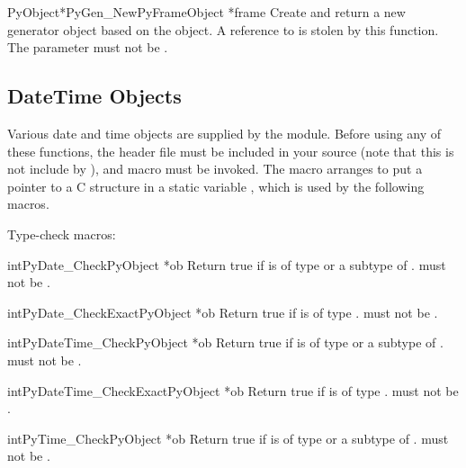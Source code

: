 \begin{cfuncdesc}{PyObject*}{PyGen_New}{PyFrameObject *frame}
  Create and return a new generator object based on the  object.
  A reference to  is stolen by this function.
  The parameter must not be \NULL{}.
\end{cfuncdesc}


\subsection{DateTime Objects \label{datetime-objects}}

Various date and time objects are supplied by the 
module.  Before using any of these functions, the header file
 must be included in your source (note that this is
not include by ), and macro 
must be invoked.  The macro arranges to put a pointer to a C structure
in a static variable , which is used by the following
macros.

Type-check macros:

\begin{cfuncdesc}{int}{PyDate_Check}{PyObject *ob}
  Return true if  is of type  or
  a subtype of .   must not be
  \NULL{}.
\end{cfuncdesc}

\begin{cfuncdesc}{int}{PyDate_CheckExact}{PyObject *ob}
  Return true if  is of type .
   must not be \NULL{}.
\end{cfuncdesc}

\begin{cfuncdesc}{int}{PyDateTime_Check}{PyObject *ob}
  Return true if  is of type  or
  a subtype of .   must not be
  \NULL{}.
\end{cfuncdesc}

\begin{cfuncdesc}{int}{PyDateTime_CheckExact}{PyObject *ob}
  Return true if  is of type .
   must not be \NULL{}.
\end{cfuncdesc}

\begin{cfuncdesc}{int}{PyTime_Check}{PyObject *ob}
  Return true if  is of type  or
  a subtype of .   must not be
  \NULL{}.
\end{cfuncdesc}

